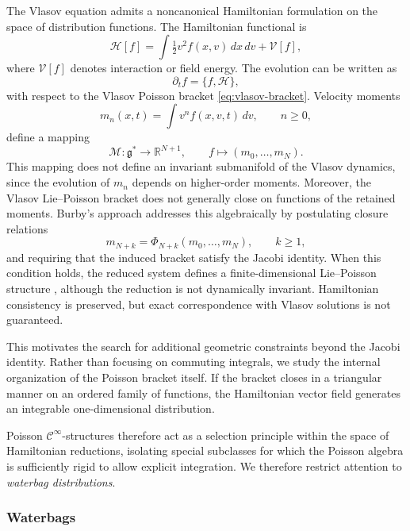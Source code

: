 \documentclass{article}
\theoremstyle{remark}
\theoremstyle{definition}
\newcommand{\cinf}{$\mathcal{C}^{\infty}$}
\begin{document}
The Vlasov equation admits a noncanonical Hamiltonian formulation on the space
of distribution functions. The Hamiltonian functional is
\begin{equation}\label{hamiltonian}
\mathcal{H}[f]
=
\int \tfrac12 v^2 f(x,v)\,dx\,dv + \mathcal{V}[f],
\end{equation}
where $\mathcal V[f]$ denotes interaction or field energy. The evolution can
be written as
\[
\partial_t f = \{f,\mathcal{H}\},
\]
with respect to the Vlasov Poisson bracket \eqref{eq:vlasov-bracket}. Velocity moments
\begin{equation}\label{momentsintegral}
m_n(x,t)=\int v^n f(x,v,t)\,dv,\qquad n\ge0,
\end{equation}
define a mapping
\[
\mathcal M:\mathfrak g^* \to \mathbb R^{N+1},\qquad
f\mapsto(m_0,\dots,m_N).
\]
This mapping does not define an invariant submanifold of the Vlasov dynamics,
since the evolution of $m_n$ depends on higher-order moments. Moreover, the
Vlasov Lie--Poisson bracket does not generally close on functions of the
retained moments. Burby’s approach \cite{Burby2023VariableMoment} addresses this algebraically by postulating closure relations
\[
m_{N+k}=\Phi_{N+k}(m_0,\dots,m_N),\qquad k\ge1,
\]
and requiring that the induced bracket satisfy the Jacobi identity. When this
condition holds, the reduced system defines a finite-dimensional
Lie--Poisson structure \cite{ScovelWeinstein1994}, although the reduction is not dynamically invariant.
Hamiltonian consistency is preserved, but exact correspondence with Vlasov
solutions is not guaranteed.



This motivates the search for additional geometric constraints beyond the
Jacobi identity. Rather than focusing on commuting integrals, we study the
internal organization of the Poisson bracket itself. If the bracket closes in
a triangular manner on an ordered family of functions, the Hamiltonian vector
field generates an integrable one-dimensional distribution.


Poisson \cinf-structures therefore act as a selection principle within the
space of Hamiltonian reductions, isolating special subclasses for which the
Poisson algebra is sufficiently rigid to allow explicit integration. 
We therefore restrict attention to \emph{waterbag distributions}.

\subsubsection{Waterbags}
\end{document}
